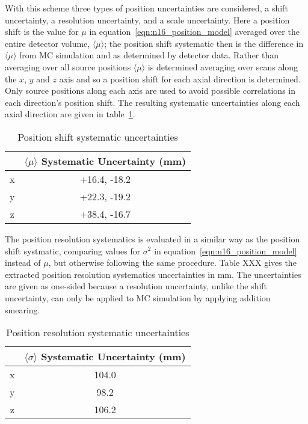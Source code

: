 With this scheme three types of position uncertainties are considered, a shift
uncertainty, a resolution uncertainty, and a scale uncertainty.
Here a position shift is the value for $\mu$ in equation~\eqref{eqn:n16_position_model}
averaged over the entire detector volume, $\langle \mu \rangle$;
the position shift systematic then is the difference in $\langle \mu \rangle$
from MC simulation and as determined by detector data.
Rather than averaging over all source positions $\langle \mu \rangle$
is determined averaging over scans along the $x$, $y$ and $z$ axis and
so a position shift for each axial direction is determined.
Only source positions along each axis are used to avoid possible correlations
in each direction's position shift. The resulting systematic uncertainties along
each axial direction are given in table~\ref{tbl:position_shift_systs}.
\begin{table}
    \centering
    \begin{tabular}{|c|c|}
            \hline
            &$\langle \mu \rangle$ Systematic Uncertainty (mm)\\
            \hline
            x&+16.4, -18.2\\
            y&+22.3, -19.2\\
            z&+38.4, -16.7\\
            \hline
    \end{tabular}
    \caption{Position shift systematic uncertainties}
    \label{tbl:position_shift_systs}
\end{table}

The position resolution systematics is evaluated in a similar way as the position
shift systmatic, comparing values for
$\sigma^{2}$ in equation~\eqref{eqn:n16_position_model} instead of $\mu$,
but otherwise following the same procedure.
Table XXX gives the extracted position resolution systematics uncertainties
in $\text{mm}$. The uncertainties are given as one-sided because a resolution uncertainty,
unlike the shift uncertainty,
can only be applied to MC simulation by applying addition smearing.
\begin{table}
    \centering
    \begin{tabular}{|c|c|}
            \hline
            &$\langle \sigma \rangle$ Systematic Uncertainty (mm)\\
            \hline
            x&104.0\\
            y&98.2\\
            z&106.2\\
            \hline
    \end{tabular}
    \caption{Position resolution systematic uncertainties}
    \label{tbl:position_resolution_systs}
\end{table}


